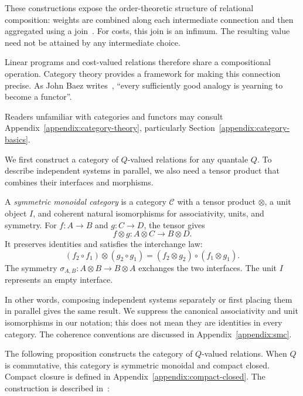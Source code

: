 These constructions expose the order-theoretic structure of relational
composition: weights are combined along each intermediate connection and then
aggregated using a join~\cite[Section~2.5.3]{fong2019seven}. For costs, this join
is an infimum. The resulting value need not be attained by any intermediate
choice.

Linear programs and cost-valued relations therefore share a compositional
operation. Category theory provides a framework for making this connection
precise. As John Baez writes~\cite[Section~2, p.~6]{baez2004quantum},
\enquote{every sufficiently good analogy is yearning to become a functor}.

Readers unfamiliar with categories and functors may consult
Appendix~\ref{appendix:category-theory}, particularly
Section~\ref{appendix:category-basics}.

We first construct a category of $Q$-valued relations for any quantale $Q$.
To describe independent systems in parallel, we also need a tensor product
that combines their interfaces and morphisms.

\begin{definition}\label{def:main-smc}
A \emph{symmetric monoidal category} is a category $\mathcal C$ with a tensor
product $\otimes$, a unit object $I$, and coherent natural isomorphisms for
associativity, units, and symmetry. For $f:A\to B$ and $g:C\to D$, the tensor gives
\[
 f\otimes g:A\otimes C\longrightarrow B\otimes D.
\]
It preserves identities and satisfies the interchange law:
\[
 (f_2\circ f_1)\otimes(g_2\circ g_1)
 =
 (f_2\otimes g_2)\circ(f_1\otimes g_1).
\]
The symmetry $\sigma_{A,B}:A\otimes B\to B\otimes A$ exchanges the two
interfaces. The unit $I$ represents an empty interface.
\end{definition}

In other words, composing independent systems separately or first placing them
in parallel gives the same result. We suppress the canonical associativity and
unit isomorphisms in our notation; this does not mean they are identities in
every category. The coherence conventions are discussed in
Appendix~\ref{appendix:smc}.

The following proposition constructs the category of $Q$-valued relations.
When $Q$ is commutative, this category is symmetric monoidal and compact closed.
Compact closure is defined in Appendix~\ref{appendix:compact-closed}.
The construction is described in~\cite{coecke2018generalizedrelations}:

